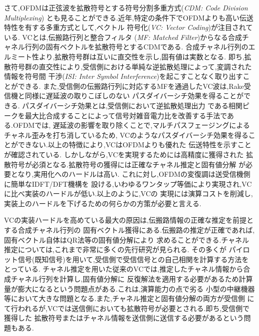 さて,OFDMは正弦波を拡散符号とする符号分割多重方式(\emph{CDM: Code Division Multiplexing})
とも見ることができる.近年,特定の条件下でOFDMよりも高い伝送特性を有する多重方式として,ベクトル
符号化(\emph{VC: Vector Coding})が注目されている.\cite{kasturia} VCとは,伝搬路行列と整合フィルタ
(\emph{MF: Matched Filter})からなる合成チャネル行列の固有ベクトルを拡散符号とするCDMである.
合成チャネル行列のエルミート性より,拡散符号群は互いに直交性を示し,固有値は実数となる.
即ち,拡散符号群の直交性により,受信側における単純な逆拡散処理によって,変調された情報を符号間
干渉(\emph{ISI: Inter Symbol Interference})を起こすことなく取り出すことができる.
また,受信側の伝搬路行列に対応するMFを通過したVC波は,Rake受信機と同様に遅延波の取りこぼしのない
パスダイバーシチ効果を得ることができる.\cite{furukawa} パスダイバーシチ効果とは,受信側において逆拡散処理出力
である相関ピークを最大比合成することによって信号対雑音電力比を改善する手法である.OFDMでは,
遅延波の影響を取り除くことで,マルチパスフェージングによるチャネル歪みを打ち消しているため,
VCのようなパスダイバーシチ効果を得ることができない.以上の特徴により,VCはOFDMよりも優れた
伝送特性を示すことが確認されている.\cite{furukawa,li,takeda,takanashi} しかしながら,VCを実現するためには高精度に獲得された
拡散符号が必須となる.拡散符号の獲得には正確なチャネル推定と固有値分解
が必要となり,実用化へのハードルは高い.\cite{takano} \cite{takeda2} これに対し,OFDMの変復調は送受信機側に簡単なIDFT/DFT機構を
設ける,いわゆるワンタップ等価により実現され,VCに比べ実装のハードルが低い.以上のように,VCの
実現には演算コストを削減し,実装上のハードルを下げるための何らかの方策が必要と言える.

VCの実装ハードルを高めている最大の原因は,伝搬路情報の正確な推定を前提とする合成チャネル行列の
固有ベクトル獲得にある.伝搬路の推定が正確であれば,固有ベクトル自体はQR法等の固有値分解により
求めることができる.チャネル推定については,これまで非常に多くの先行研究が見られる.\cite{nagate} 
\cite{imamura} その多くが
パイロット信号(既知信号)を用いて,受信側で受信信号との自己相関を計算する方法をとっている.
チャネル推定を用いた従来のVCでは,推定したチャネル情報から合成チャネル行列を計算し,固有値分解に
反復解法を適用する必要があるため計算量が膨大になるという問題点がある.これは,演算能力の点で劣る
小型の中継機器等において大きな問題となる.また,チャネル推定と固有値分解の両方が受信側
にて行われるが,VCでは送信側においても拡散符号が必要とされる.即ち,受信側で獲得した
拡散符号またはチャネル情報を送信側に送信する必要があるという問題もある.

